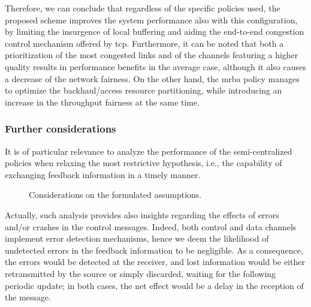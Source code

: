 Therefore, we can conclude that regardless of the specific policies used, the proposed scheme improves the system performance also with this configuration, by limiting the insurgence of local buffering and aiding the end-to-end congestion control mechanism offered by \gls{tcp}. Furthermore, it can be noted that both a prioritization of the most congested links and of the channels featuring a higher quality results in performance benefits in the average case, although it also causes a decrease of the network fairness. On the other hand, the \gls{mrba} policy manages to optimize the backhaul/access resource partitioning, while introducing an increase in the throughput fairness at the same time.

\vspace{-.3cm}
\subsubsection{Further considerations}

It is of particular relevance to analyze the performance of the semi-centralized policies when relaxing the most restrictive hypothesis, i.e., the capability of exchanging feedback information in a timely manner.
\begin{figure}[t!]
  \centering
  \hfill
   \caption{Considerations on the formulated assumptions.}
  \label{Fig:Assump}
      \vspace{-.6cm} 
\end{figure}

Actually, such analysis provides also insights regarding the effects of errors and/or crashes in the control messages. Indeed, both control and data channels implement error detection mechanisms, hence we deem the likelihood of undetected errors in the feedback information to be negligible. As a consequence, the errors would be detected at the receiver, and lost information would be either retransmitted by the source or simply discarded, waiting for the following periodic update; in both cases, the net effect would be a delay in the reception of the message.

